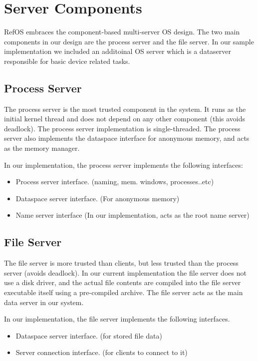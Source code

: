 \section{Server Components}

RefOS embraces the component-based multi-server OS design. The two main components in our design are
the process server and the file server. In our sample implementation we included an additoinal OS
server which is a dataserver responsible for basic device related tasks.

\subsection{Process Server}

The process server is the most trusted component in the system. It runs as the initial kernel thread
and does not depend on any other component (this avoids deadlock). The process server implementation
is single-threaded. The process server also implements the dataspace interface for anonymous memory,
and acts as the memory manager.

In our implementation, the process server implements the following interfaces:
\begin{itemize}
    \item Process server interface. (naming, mem. windows, processes..etc)
    \item Dataspace server interface. (For anonymous memory)
    \item Name server interface (In our implementation, acts as the root name server)
\end{itemize}

\subsection{File Server}

The file server is more trusted than clients, but less trusted than the process server (avoids
deadlock). In our current implementation the file server does not use a disk driver, and the actual
file contents are compiled into the file server executable itself using a pre-compiled archive.
The file server acts as the main data server in our system.

In our implementation, the file server implements the following interfaces.
\begin{itemize}
    \item Dataspace server interface. (for stored file data)
    \item Server connection interface. (for clients to connect to it)
\end{itemize}

